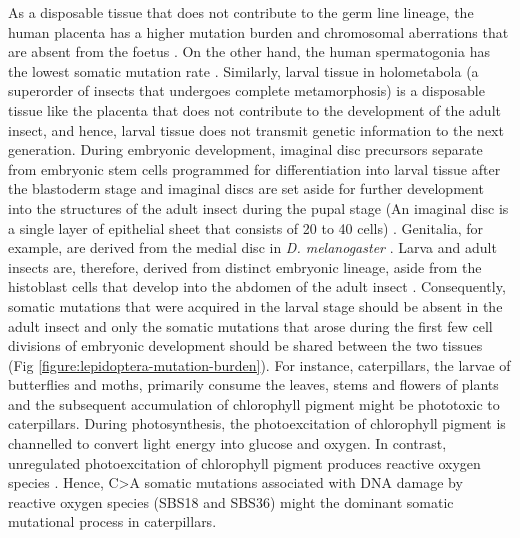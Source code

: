 As a disposable tissue that does not contribute to the germ line lineage, the human placenta has a higher mutation burden and chromosomal aberrations that are absent from the foetus \cite{Coorens2021-ct}. On the other hand, the human spermatogonia has the lowest somatic mutation rate \cite{Rahbari2016-ot}. Similarly, larval tissue in holometabola (a superorder of insects that undergoes complete metamorphosis) is a disposable tissue like the placenta that does not contribute to the development of the adult insect, and hence, larval tissue does not transmit genetic information to the next generation. During embryonic development, imaginal disc precursors separate from embryonic stem cells programmed for differentiation into larval tissue after the blastoderm stage and imaginal discs are set aside for further development into the structures of the adult insect during the pupal stage (An imaginal disc is a single layer of epithelial sheet that consists of 20 to 40 cells) \cite{Wieschaus1976}. Genitalia, for example, are derived from the medial disc in \textit{D. melanogaster} \cite{Bate1993}. Larva and adult insects are, therefore, derived from distinct embryonic lineage, aside from the histoblast cells that develop into the abdomen of the adult insect \cite{Bate1993}. Consequently, somatic mutations that were acquired in the larval stage should be absent in the adult insect and only the somatic mutations that arose during the first few cell divisions of embryonic development should be shared between the two tissues (Fig \ref{figure:lepidoptera-mutation-burden}). For instance, caterpillars, the larvae of butterflies and moths, primarily consume the leaves, stems and flowers of plants and the subsequent accumulation of chlorophyll pigment might be phototoxic to caterpillars. During photosynthesis, the photoexcitation of chlorophyll pigment is channelled to convert light energy into glucose and oxygen. In contrast, unregulated photoexcitation of chlorophyll pigment produces reactive oxygen species \cite{Foyer2018-in}. Hence, C>A somatic mutations associated with DNA damage by reactive oxygen species (SBS18 and SBS36) might the dominant somatic mutational process in caterpillars. 

